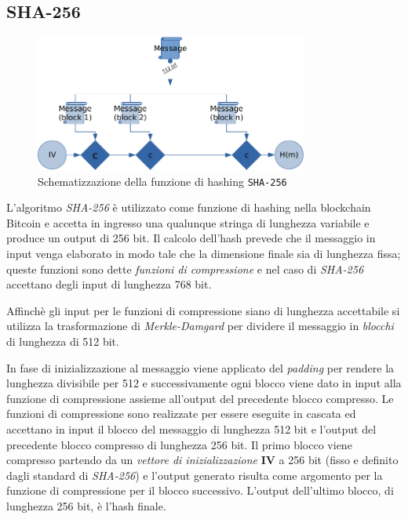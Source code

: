 \subsection{SHA-256}
\begin{figure}
    \centering
    \includegraphics[width=0.8\textwidth]{images/sha256.png}
    \caption{Schematizzazione della funzione di hashing \texttt{SHA-256}}
\end{figure}
L'algoritmo \textit{SHA-256} è utilizzato come funzione di hashing nella blockchain Bitcoin e accetta in ingresso una qualunque stringa di lunghezza variabile e produce un output di 256 bit.\newline
Il calcolo dell'hash prevede che il messaggio in input venga elaborato in modo tale che la dimensione finale sia di lunghezza fissa; queste funzioni sono dette \textit{funzioni di compressione} e nel caso di \textit{SHA-256} accettano degli input di lunghezza 768 bit.

Affinchè gli input per le funzioni di compressione siano di lunghezza accettabile si utilizza la trasformazione di \textit{Merkle-Damgard} per dividere il messaggio in \textit{blocchi} di lunghezza di 512 bit.

In fase di inizializzazione al messaggio viene applicato del \textit{padding} per rendere la lunghezza divisibile per 512 e successivamente ogni blocco viene dato in input alla funzione di compressione assieme all'output del precedente blocco compresso. Le funzioni di compressione sono realizzate per essere eseguite in cascata ed accettano in input il blocco del messaggio di lunghezza 512 bit e l'output del precedente blocco compresso di lunghezza 256 bit.\newline
Il primo blocco viene compresso partendo da un \textit{vettore di inizializzazione} \textbf{IV} a 256 bit (fisso e definito dagli standard di \textit{SHA-256}) e l'output generato risulta come argomento per la funzione di compressione per il blocco successivo. L'output dell'ultimo blocco, di lunghezza 256 bit, è l'hash finale.

